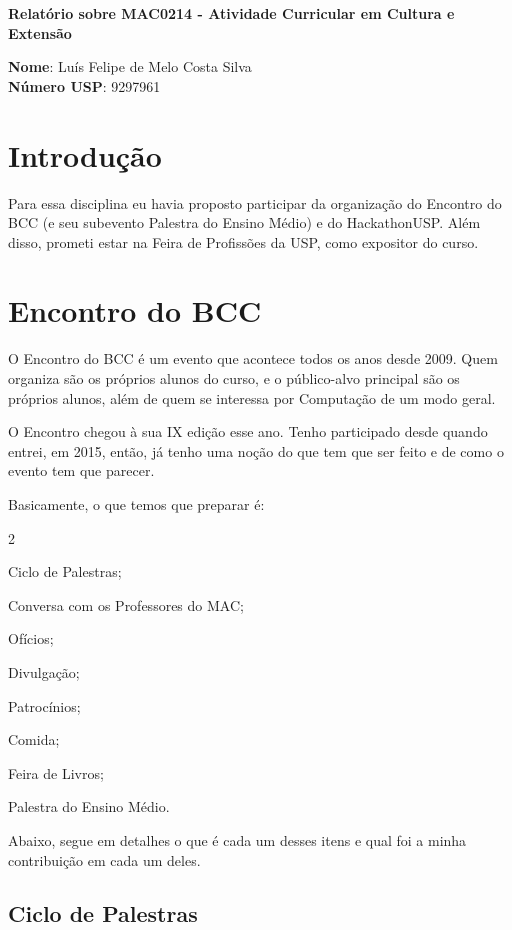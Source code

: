 \documentclass[12pt,letterpaper]{article}
\begin{document}
	\begin{center}
		\Large \bf
		Relatório sobre MAC0214 - Atividade Curricular em Cultura e Extensão
	\end{center}
	
	\textbf{Nome}: Luís Felipe de Melo Costa Silva \\
	\textbf{Número USP}: 9297961
	
	\section*{Introdução}
	Para essa disciplina eu havia proposto participar da organização do Encontro do BCC (e seu subevento Palestra do Ensino Médio) e do HackathonUSP. Além disso, prometi estar na Feira de Profissões da USP, como expositor do curso.
	
	\section{Encontro do BCC}
	O Encontro do BCC é um evento que acontece todos os anos desde 2009. Quem organiza são os próprios alunos do curso, e o público-alvo principal são os próprios alunos, além de quem se interessa por Computação de um modo geral.
	
	O Encontro chegou à sua IX edição esse ano. Tenho participado desde quando entrei, em 2015, então, já tenho uma noção do que tem que ser feito e de como o evento tem que parecer. 
	
	Basicamente, o que temos que preparar é:
	
	\begin{itemize}
	\end{itemize}

	Abaixo, segue em detalhes o que é cada um desses itens e qual foi a minha contribuição em cada um deles.
	
	\subsection{Ciclo de Palestras}
	
\end{document}
